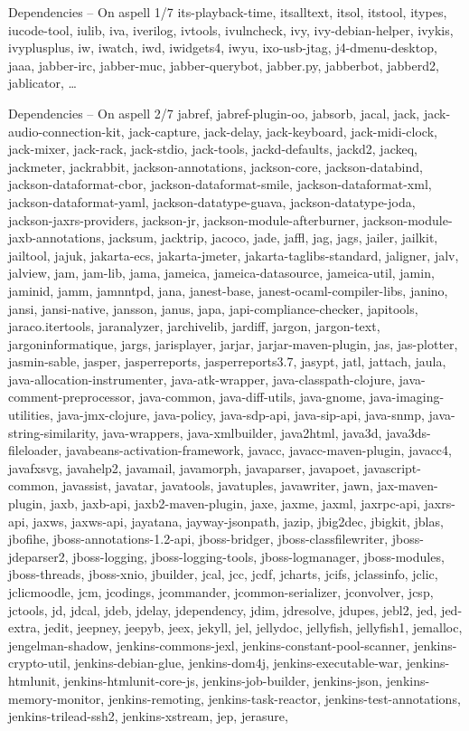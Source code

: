 \documentclass{beamer}
\begin{document}
\begin{frame}{Dependencies – On aspell 1/7}
its-playback-time, itsalltext, itsol, itstool, itypes, iucode-tool, iulib, iva, iverilog, ivtools, ivulncheck, ivy, ivy-debian-helper, ivykis, ivyplusplus, iw, iwatch, iwd, iwidgets4, iwyu, ixo-usb-jtag, j4-dmenu-desktop, jaaa, jabber-irc, jabber-muc, jabber-querybot, jabber.py, jabberbot, jabberd2, jablicator, …
\end{frame}

\begin{frame}{Dependencies – On aspell 2/7}
\tiny jabref, jabref-plugin-oo, jabsorb, jacal, jack, jack-audio-connection-kit, jack-capture, jack-delay, jack-keyboard, jack-midi-clock, jack-mixer, jack-rack, jack-stdio, jack-tools, jackd-defaults, jackd2, jackeq, jackmeter, jackrabbit, jackson-annotations, jackson-core, jackson-databind, jackson-dataformat-cbor, jackson-dataformat-smile, jackson-dataformat-xml, jackson-dataformat-yaml, jackson-datatype-guava, jackson-datatype-joda, jackson-jaxrs-providers, jackson-jr, jackson-module-afterburner, jackson-module-jaxb-annotations, jacksum, jacktrip, jacoco, jade, jaffl, jag, jags, jailer, jailkit, jailtool, jajuk, jakarta-ecs, jakarta-jmeter, jakarta-taglibs-standard, jaligner, jalv, jalview, jam, jam-lib, jama, jameica, jameica-datasource, jameica-util, jamin, jaminid, jamm, jamnntpd, jana, janest-base, janest-ocaml-compiler-libs, janino, jansi, jansi-native, jansson, janus, japa, japi-compliance-checker, japitools, jaraco.itertools, jaranalyzer, jarchivelib, jardiff, jargon, jargon-text, jargoninformatique, jargs, jarisplayer, jarjar, jarjar-maven-plugin, jas, jas-plotter, jasmin-sable, jasper, jasperreports, jasperreports3.7, jasypt, jatl, jattach, jaula, java-allocation-instrumenter, java-atk-wrapper, java-classpath-clojure, java-comment-preprocessor, java-common, java-diff-utils, java-gnome, java-imaging-utilities, java-jmx-clojure, java-policy, java-sdp-api, java-sip-api, java-snmp, java-string-similarity, java-wrappers, java-xmlbuilder, java2html, java3d, java3ds-fileloader, javabeans-activation-framework, javacc, javacc-maven-plugin, javacc4, javafxsvg, javahelp2, javamail, javamorph, javaparser, javapoet, javascript-common, javassist, javatar, javatools, javatuples, javawriter, jawn, jax-maven-plugin, jaxb, jaxb-api, jaxb2-maven-plugin, jaxe, jaxme, jaxml, jaxrpc-api, jaxrs-api, jaxws, jaxws-api, jayatana, jayway-jsonpath, jazip, jbig2dec, jbigkit, jblas, jbofihe, jboss-annotations-1.2-api, jboss-bridger, jboss-classfilewriter, jboss-jdeparser2, jboss-logging, jboss-logging-tools, jboss-logmanager, jboss-modules, jboss-threads, jboss-xnio, jbuilder, jcal, jcc, jcdf, jcharts, jcifs, jclassinfo, jclic, jclicmoodle, jcm, jcodings, jcommander, jcommon-serializer, jconvolver, jcsp, jctools, jd, jdcal, jdeb, jdelay, jdependency, jdim, jdresolve, jdupes, jebl2, jed, jed-extra, jedit, jeepney, jeepyb, jeex, jekyll, jel, jellydoc, jellyfish, jellyfish1, jemalloc, jengelman-shadow, jenkins-commons-jexl, jenkins-constant-pool-scanner, jenkins-crypto-util, jenkins-debian-glue, jenkins-dom4j, jenkins-executable-war, jenkins-htmlunit, jenkins-htmlunit-core-js, jenkins-job-builder, jenkins-json, jenkins-memory-monitor, jenkins-remoting, jenkins-task-reactor, jenkins-test-annotations, jenkins-trilead-ssh2, jenkins-xstream, jep, jerasure, 
\end{frame}
\end{document}
